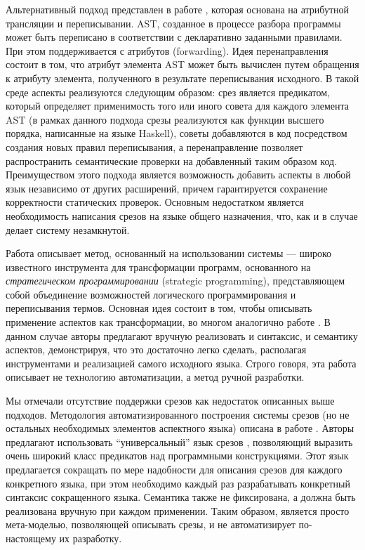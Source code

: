 Альтернативный подход представлен в работе \cite{VanWyk03}, которая основана на атрибутной трансляции и переписывании. AST, созданное в процессе разбора программы может быть переписано в соответствии с декларативно заданными правилами. При этом поддерживается с  атрибутов (forwarding). Идея перенаправления состоит в том, что атрибут элемента AST может быть вычислен путем обращения к атрибуту элемента, полученного в результате переписывания исходного. В такой среде аспекты реализуются следующим образом: срез является предикатом, который определяет применимость того или иного совета для каждого элемента AST (в рамках данного подхода срезы реализуются как функции высшего порядка, написанные на языке Haskell), советы добавляются в код посредством создания новых правил переписывания, а перенаправление позволяет распространить семантические проверки на добавленный таким образом код. Преимуществом этого подхода является возможность добавить аспекты в любой язык независимо от других расширений, причем гарантируется сохранение корректности статических проверок. Основным недостатком является необходимость написания срезов на языке общего назначения, что, как и в случае  делает систему незамкнутой.

Работа \cite{DSAL = Library+Notation} описывает метод, основанный на использовании системы  \cite{???} --- широко известного инструмента для трансформации программ, основанного на \emph{стратегическом программировании} (strategic programming), представляющем собой объединение возможностей логического программирования и переписывания термов. Основная идея состоит в том, чтобы описывать применение аспектов как трансформации, во многом аналогично работе \cite{VanWyk03}. В данном случае авторы предлагают вручную реализовать и синтаксис, и семантику аспектов, демонстрируя, что это достаточно легко сделать, располагая инструментами  и реализацией самого исходного языка. Строго говоря, эта работа описывает не технологию автоматизации, а метод ручной разработки.

Мы отмечали отсутствие поддержки срезов как недостаток описанных выше подходов. Методология автоматизированного построения системы срезов (но не остальных необходимых элементов аспектного языка) описана в работе \cite{CPL}. Авторы предлагают использовать ``универсальный'' язык срезов , позволяющий выразить очень широкий класс предикатов над программными конструкциями. Этот язык предлагается сокращать по мере надобности для описания срезов для каждого конкретного языка, при этом необходимо каждый раз разрабатывать конкретный синтаксис сокращенного языка. Семантика  также не фиксирована, а должна быть реализована вручную при каждом применении. Таким образом,  является просто мета-моделью, позволяющей описывать срезы, и не автоматизирует по-настоящему их разработку.

